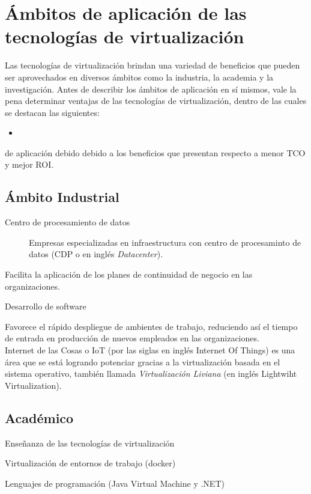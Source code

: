 \section{Ámbitos de aplicación de las tecnologías de virtualización} \label{ambitos}

Las tecnologías de virtualización brindan una variedad de beneficios que pueden ser aprovechados en diversos ámbitos como la industria, la academia y la investigación. Antes de describir los ámbitos de aplicación en sí mismos, vale la pena determinar  ventajas de las tecnologías de virtualización, dentro de las cuales se destacan las siguientes:

\begin{itemize}
	\item 
\end{itemize}



  de aplicación debido debido a los beneficios que presentan respecto a menor TCO y mejor ROI. 



\subsection{Ámbito Industrial}

\begin{description}
	\item[Centro de procesamiento de datos] Empresas especializadas en infraestructura con centro de procesaminto de datos (CDP o en inglés \textit{Datacenter}).
\end{description}



Facilita la aplicación de los planes de continuidad de negocio en las organizaciones. 

Desarrollo de software

Favorece el rápido despliegue de ambientes de trabajo, reduciendo así el tiempo de entrada en producción de nuevos empleados en las organizaciones. \\


Internet de las Cosas o IoT (por las siglas en inglés Internet Of Things) es una área que se está logrando potenciar gracias a la virtualización basada en el sistema operativo, también llamada \textit{Virtualización Liviana} (en inglés Lightwiht Virtualization). 



\subsection{Académico}

Enseñanza de las tecnologías de virtualización


Virtualización de entornos de trabajo (docker)


Lenguajes de programación (Java Virtual Machine y .NET)
